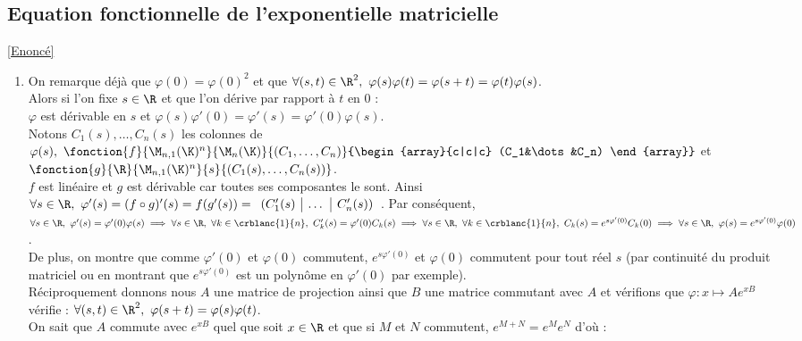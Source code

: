 \documentclass{book}
\begin{document}
	\subsection{Equation fonctionnelle de l'exponentielle matricielle }
	\label{sec:equation-fonctionnelle-de-lexponentielle-matricielle-etoile3}
	\textcolor{blue}{\hyperref[Equation fonctionnelle de l'exponentielle matricielle]{[Enoncé]}}\\
	\begin{enumerate}[leftmargin=*]
		\item On remarque déjà que $\varphi(0)=\varphi(0)^2$ et que $\forall (s,t)\in \R^2,\ \varphi(s)\varphi(t)=\varphi(s+t)=\varphi(t)\varphi(s)$.\\
		Alors si l'on fixe $s\in \R$ et que l'on dérive par rapport à $t$ en $0$ :\\
		$\varphi$ est dérivable en $s$ et $\varphi(s)\varphi'(0)=\varphi'(s)=\varphi'(0)\varphi(s)$.\\
		Notons $C_1(s),\dots,C_n(s)$ les colonnes de $\varphi(s),\ \fonction{f}{\M_{n,1}(\K)^n}{\M_n(\K)}{(C_1,\dots,C_n)}{\begin{array}{c|c|c}
				(C_1&\dots&C_n) 
		\end{array}}$ et $\fonction{g}{\R}{\M_{n,1}(\K)^n}{s}{(C_1(s),\dots,C_n(s))}$.\\
		$f$ est linéaire et $g$ est dérivable car toutes ses composantes le sont. Ainsi $\forall s\in \R,\ \varphi'(s)=(f\circ g)'(s)=f(g'(s))=\begin{array}{c|c|c}
			(C_1'(s)&\dots&C_n'(s)) 
		\end{array}$. Par conséquent,\\
		$\forall s\in \R,\ \varphi'(s)=\varphi'(0)\varphi(s)\implies \forall s\in \R,\ \forall k\in \crblanc{1}{n},\ C_k'(s)=\varphi'(0)C_k(s)\implies \forall s\in \R,\ \forall k\in \crblanc{1}{n},\ C_k(s)=e^{s\varphi'(0)}C_k(0)\implies \forall s\in \R,\ \varphi(s)=e^{s\varphi'(0)}\varphi(0)$.\\
		De plus, on montre que comme $\varphi'(0)$ et $\varphi(0)$ commutent, $e^{s\varphi'(0)}$ et $\varphi(0)$ commutent pour tout réel $s$ (par continuité du produit matriciel ou en montrant que $e^{s\varphi'(0)}$ est un polynôme en $\varphi'(0)$ par exemple).\\
		Réciproquement donnons nous $A$ une matrice de projection ainsi que $B$ une matrice commutant avec $A$ et vérifions que $\varphi:x\mapsto Ae^{xB}$ vérifie : $\forall (s,t)\in \R^2,\ \varphi(s+t)=\varphi(s)\varphi(t)$.\\
		On sait que $A$ commute avec $e^{xB}$ quel que soit $x\in \R$ et que si $M$ et $N$ commutent, $e^{M+N}=e^Me^N$ d'où :\\

\end{enumerate}
\end{document}
